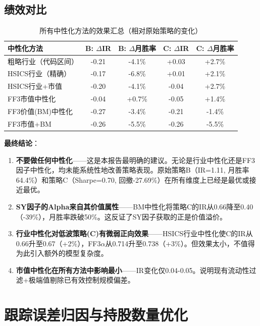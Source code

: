 \documentclass[10pt,a4paper]{ctexart}
\begin{document}
\subsection{绩效对比}

\begin{table}[htbp]
\centering
\caption{所有中性化方法的效果汇总（相对原始策略的变化）}
\begin{tabular}{lcccc}
\toprule
\textbf{中性化方法} & \textbf{B: $\Delta$IR} & \textbf{B: $\Delta$月胜率} & \textbf{C: $\Delta$IR} & \textbf{C: $\Delta$月胜率} \\
\midrule
粗略行业（代码区间） & -0.21 & -4.1\% & +0.03 & +2.7\% \\
HSICS行业（精确） & -0.17 & -6.8\% & +0.01 & +2.1\% \\
HSICS行业+市值 & -0.20 & -4.1\% & -0.04 & +2.7\% \\
FF3市值中性化 & -0.04 & +0.7\% & -0.05 & +1.4\% \\
FF3价值(BM)中性化 & -0.27 & -3.4\% & -0.21 & -1.4\% \\
FF3市值+BM & -0.26 & -5.5\% & -0.26 & -5.5\% \\
\bottomrule
\end{tabular}
\end{table}

\textbf{最终结论}：

\begin{enumerate}[label=(\arabic*)]
    \item \textbf{不要做任何中性化}——这是本报告最明确的建议。无论是行业中性化还是FF3因子中性化，均未能系统性地改善策略表现。原始策略B（IR=1.11, 月胜率64.4\%）和策略C（Sharpe=0.70, 回撤-27.69\%）在所有维度上已经是最优或接近最优。
    \item \textbf{SY因子的Alpha来自其价值属性}——BM中性化将策略C的IR从0.66降至0.40（-39\%），月胜率跌破50\%。这反证了SY因子获取的正是价值溢价。
    \item \textbf{行业中性化对低波策略(C)有微弱正向效果}——HSICS行业中性化使C的IR从0.66升至0.67（+2\%），FF3$\alpha$从0.714升至0.738（+3\%）。但效果太小，不值得为此引入额外的模型复杂度。
    \item \textbf{市值中性化在所有方法中影响最小}——IR变化仅0.04-0.05。说明现有流动性过滤+极端值剔除已有效控制规模偏差。
\end{enumerate}

\section{跟踪误差归因与持股数量优化}
\end{document}
